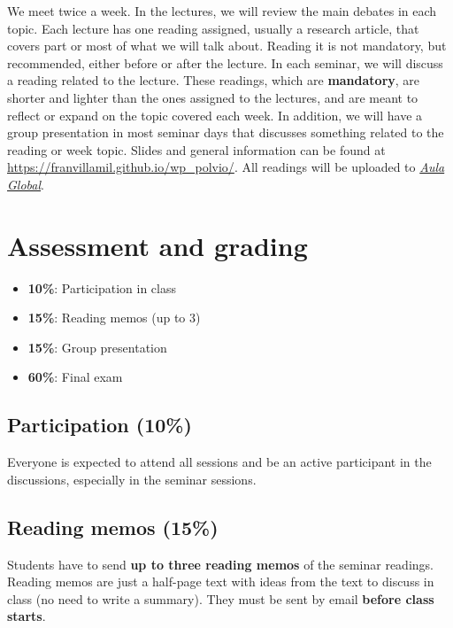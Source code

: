 \documentclass[12pt, a4paper]{article}
\begin{document}
We meet twice a week. In the lectures, we will review the main debates in each topic. Each lecture has one reading assigned, usually a research article, that covers part or most of what we will talk about. Reading it is not mandatory, but recommended, either before or after the lecture. In each seminar, we will discuss a reading related to the lecture. These readings, which are \textbf{mandatory}, are shorter and lighter than the ones assigned to the lectures, and are meant to reflect or expand on the topic covered each week. In addition, we will have a group presentation in most seminar days that discusses something related to the reading or week topic.
Slides and general information can be found at \href{https://franvillamil.github.io/wp_polvio/}{https://franvillamil.github.io/wp\_polvio/}. All readings will be uploaded to \href{https://aulaglobal.uc3m.es/}{\textit{Aula Global}}.

\section{Assessment and grading}

\begin{itemize}
\setlength\itemsep{0pt}
  \item \textbf{10\%}: Participation in class
  \item \textbf{15\%}: Reading memos (up to 3)
  \item \textbf{15\%}: Group presentation
  \item \textbf{60\%}: Final exam
\end{itemize}

\subsection*{Participation (10\%)}

Everyone is expected to attend all sessions and be an active participant in the discussions, especially in the seminar sessions.

\subsection*{Reading memos (15\%)}

Students have to send \textbf{up to three reading memos} of the seminar readings. Reading memos are just a half-page text with ideas from the text to discuss in class (no need to write a summary). They must be sent by email \textbf{before class starts}.
\end{document}
